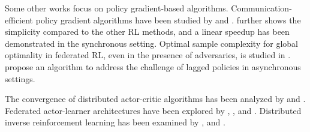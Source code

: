 Some other works focus on policy gradient-based algorithms. Communication-efficient policy gradient algorithms have been studied by \cite{fan2021fault} and \cite{chen2021communication}. \cite{lan2023improved} further shows the
simplicity compared to the other RL methods, and a linear speedup has been demonstrated in the synchronous setting. Optimal sample complexity for global optimality in federated RL, even in the presence of adversaries, is studied in \cite{ganesh2024global}. \citep{lan2024asynchronous} propose an algorithm to address the challenge of lagged policies in asynchronous settings.

The convergence of distributed actor-critic algorithms has been analyzed by \cite{shen2023towards} and \cite{chen2022sample}. Federated actor-learner architectures have been explored by \cite{assran2019gossip}, \cite{espeholt2018impala}, and \cite{mnih2016asynchronous}. Distributed inverse reinforcement learning has been examined by \cite{banerjee2021identity}, \cite{gong2023federated} and \cite{liu2022distributed, liu2023meta, liu2024learning, liutrajectory}.